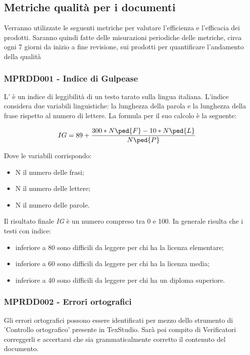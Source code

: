 {\subsection{Metriche qualità per i documenti}
\label{sec:qualita_prodotto}
Verranno utilizzate le seguenti metriche per valutare l’efficienza e l’efficacia dei prodotti. Saranno quindi fatte delle misurazioni periodiche delle metriche, circa ogni 7 giorni da inizio a fine revisione, sui prodotti per quantificare l'andamento della qualità
\subsubsection{MPRDD001 - Indice di Gulpease}
L' è un indice di leggibilità di un testo tarato sulla lingua italiana.
L'indice considera due variabili linguistiche: la lunghezza della parola e la lunghezza della frase rispetto al numero di lettere. La formula per il suo calcolo è la seguente:
\begin{center}
    \begin{displaymath}
        IG = 89 + {300 * N\ped{F} - 10 * N\ped{L} \over N\ped{P}}
    \end{displaymath}
\end{center}
Dove le variabili corrispondo:
\begin{itemize}
    \item N il numero delle frasi;
    \item N il numero delle lettere; 
    \item N il numero delle parole.
\end{itemize}
Il risultato finale  \emph{IG} è un numero compreso tra 0 e 100. In generale risulta che i testi con indice:
\begin{itemize}
    \item inferiore a 80 sono difficili da leggere per chi ha la licenza elementare;
    \item inferiore a 60 sono difficili da leggere per chi ha la licenza media;
    \item inferiore a 40 sono difficili da leggere per chi ha un diploma superiore.
\end{itemize}
\subsubsection{MPRDD002 - Errori ortografici}
Gli errori ortografici possono essere identificati per mezzo dello strumento di 'Controllo ortografico' presente in TexStudio. Sarà poi compito di Verificatori correggerli e accertarsi che sia grammaticalmente corretto il contenuto del documento.

}
